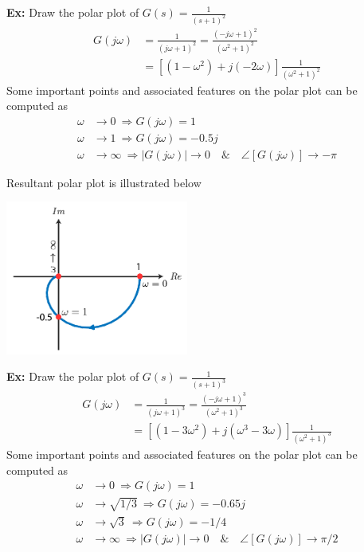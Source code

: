 \documentclass{article}
\begin{document}
\vspace{6 pt}

\textbf{Ex:} Draw the polar plot of  $G(s) = \frac{1}{(s+1)^2}$
%
\begin{align*}
  G(j \omega ) &= \frac{1}{ (j \omega + 1)^2 } = \frac{ (-j \omega + 1)^2 }{( \omega^2 +1 )^2 }
\\
&= \left[ \left( 1 - \omega^2 \right) + j ( - 2 \omega) \right] \frac{1}{( \omega^2 +1 )^2 }
\end{align*}
%
Some important points and associated features on the polar plot can be computed as
\begin{align*}
  \omega &\to 0 \ \Rightarrow G(j \omega) = 1
\\
 \omega &\to 1 \ \Rightarrow G(j \omega) = -0.5 j 
\\
 \omega &\to  \infty \ \Rightarrow | G(j \omega) | \to 0 \quad \& \quad \angle  [ G(j \omega) ] \to -\pi
\end{align*}

Resultant polar plot is illustrated below

\vspace{6 pt}

  \begin{minipage}[h]{1\linewidth}
    \begin{center}
      \includegraphics[width=0.45\textwidth]{polar4}
    \end{center}
  \end{minipage}

\vspace{6 pt}

\textbf{Ex:} Draw the polar plot of  $G(s) = \frac{1}{(s+1)^3}$
%
\begin{align*}
  G(j \omega ) &= \frac{1}{ (j \omega + 1)^3 } = \frac{ (-j \omega + 1)^3 }{( \omega^2 +1 )^3 }
\\
&= \left[ \left( 1 - 3 \omega^2 \right) + j (\omega^3 - 3 \omega) \right] \frac{1}{( \omega^2 +1 )^3 }
\end{align*}
%
Some important points and associated features on the polar plot can be computed as
\begin{align*}
  \omega &\to 0 \ \Rightarrow G(j \omega) = 1
\\
 \omega &\to \sqrt{1/3} \ \Rightarrow G(j \omega) = -0.65 j 
\\
 \omega &\to \sqrt{3} \ \Rightarrow G(j \omega) = -1/4 
\\
 \omega &\to  \infty \ \Rightarrow | G(j \omega) | \to 0 \quad \& \quad \angle  [ G(j \omega) ] \to \pi/2
\end{align*}
\end{document}
